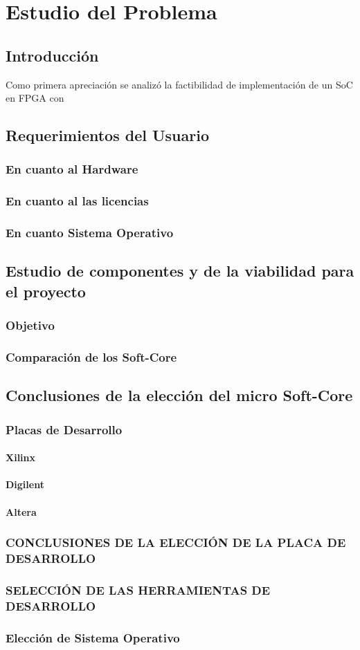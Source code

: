 \chapter{Estudio del Problema}
	\section{Introducción}
	Como primera apreciación se analizó la factibilidad de implementación de un
	SoC  en FPGA con 
	\section{Requerimientos del Usuario}
			\subsection{En cuanto al Hardware}
			\subsection{En cuanto al las licencias} 
			\subsection{En cuanto Sistema Operativo} 	 
	\section{Estudio de componentes y de la viabilidad para el proyecto}	
			\subsection{Objetivo} 	 
			\subsection{Comparación de los Soft-Core} 
	\section{Conclusiones de la elección del micro
	 	Soft-Core}
 			\subsection{Placas de Desarrollo}
				\subsubsection{Xilinx}
				\subsubsection{Digilent} 	 
				\subsubsection{Altera}
 			\subsection{CONCLUSIONES DE LA ELECCIÓN DE LA PLACA DE
 		DESARROLLO}
 			\subsection{SELECCIÓN DE LAS HERRAMIENTAS DE DESARROLLO} 	 
 			\subsection{Elección de Sistema Operativo}
 			